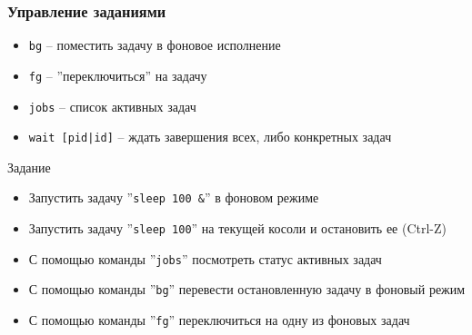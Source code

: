
\begin{frame}
	\frametitle{Управление заданиями}
	
	\begin{itemize}
		\item {\tt bg} -- поместить задачу в фоновое исполнение
		\item {\tt fg} -- ''переключиться'' на задачу
		\item {\tt jobs} -- список активных задач
		\item {\tt wait [pid|id]} -- ждать завершения всех, либо конкретных задач
	\end{itemize}
	\pause
	\begin{block}{Задание}
		\begin{itemize}
			\item Запустить задачу ''{\tt sleep 100 \&}'' в фоновом режиме
			\item Запустить задачу ''{\tt sleep 100}'' на текущей косоли и остановить ее (Ctrl-Z)
			\item С помощью команды ''{\tt jobs}'' посмотреть статус активных задач
			\item С помощью команды ''{\tt bg}'' перевести остановленную задачу в фоновый режим
			\item С помощью команды ''{\tt fg}'' переключиться на одну из фоновых задач
		\end{itemize}
	\end{block}
\end{frame}



